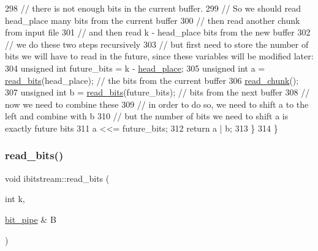 \begin{DoxyCode}
298     \textcolor{comment}{// there is not enough bits in the current buffer.}
299     \textcolor{comment}{// So we should read head\_place many bits from the current buffer}
300     \textcolor{comment}{// then read another chunk from input file}
301     \textcolor{comment}{// and then read k - head\_place bits from the new buffer}
302     \textcolor{comment}{// we do these two steps recursively}
303     \textcolor{comment}{// but first need to store the number of bits we will have to read in the future, since these variables
       will be modified later:}
304     \textcolor{keywordtype}{unsigned} \textcolor{keywordtype}{int} future\_bits = k - \hyperlink{classibitstream_a7b96359ac1534a5565e6e9b0cc53a0b3}{head\_place};
305     \textcolor{keywordtype}{unsigned} \textcolor{keywordtype}{int} a = \hyperlink{classibitstream_a2fdcaecf10fefa6942dcd5286a2696e0}{read\_bits}(head\_place); \textcolor{comment}{// the bits from the current buffer}
306     \hyperlink{classibitstream_ac62c26004436d83f337f4aeba0895e20}{read\_chunk}();
307     \textcolor{keywordtype}{unsigned} \textcolor{keywordtype}{int} b = \hyperlink{classibitstream_a2fdcaecf10fefa6942dcd5286a2696e0}{read\_bits}(future\_bits); \textcolor{comment}{// bits from the next buffer}
308     \textcolor{comment}{// now we need to combine these}
309     \textcolor{comment}{// in order to do so, we need to shift a to the left and combine with b}
310     \textcolor{comment}{// but the number of bits we need to shift a is exactly future bits}
311     a <<= future\_bits;
312     \textcolor{keywordflow}{return} a | b;
313   \}
314 \}
\end{DoxyCode}
\mbox{\label{classibitstream_a4bb7a698ab44c1e2fe21b4daa880bd6c}} 
\subsubsection{\texorpdfstring{read\+\_\+bits()}{read\_bits()}\hspace{0.1cm}{\footnotesize\ttfamily [2/2]}}
{\footnotesize\ttfamily void ibitstream\+::read\+\_\+bits (\begin{DoxyParamCaption}\item[{int}]{k,  }\item[{\hyperlink{classbit__pipe}{bit\+\_\+pipe} \&}]{B }\end{DoxyParamCaption})}



